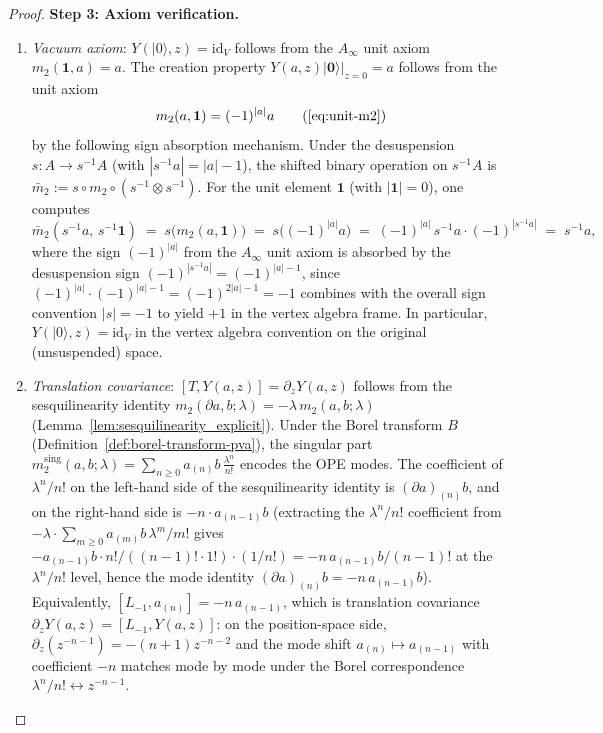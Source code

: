 \begin{proof}
\medskip\noindent\textbf{Step 3: Axiom verification.}
\begin{enumerate}[label=(\roman*)]
\item \emph{Vacuum axiom}: $Y(|0\rangle, z) = \mathrm{id}_V$ follows from the $A_\infty$ unit axiom $m_2(\mathbf{1},a) = a$. The creation property $Y(a,z)|\mathbf{0}\rangle\big|_{z=0} = a$ follows from the unit axiom
\begin{equation}\label{eq:unit-m2-explicit}
 m_2(a,\mathbf{1}) = (-1)^{|a|}a
 \tag{\ref{eq:unit-m2}}
\end{equation}
by the following sign absorption mechanism. Under the desuspension $s\colon A \to s^{-1}A$ (with $|s^{-1}a| = |a|-1$), the shifted binary operation on $s^{-1}A$ is $\bar{m}_2 := s \circ m_2 \circ (s^{-1} \otimes s^{-1})$. For the unit element $\mathbf{1}$ (with $|\mathbf{1}|=0$), one computes
\[
 \bar{m}_2(s^{-1}a,\, s^{-1}\mathbf{1})
 \;=\; s\bigl(m_2(a,\mathbf{1})\bigr)
 \;=\; s\bigl((-1)^{|a|}a\bigr)
 \;=\; (-1)^{|a|}\, s^{-1}a \cdot (-1)^{|s^{-1}a|}
 \;=\; s^{-1}a,
\]
where the sign $(-1)^{|a|}$ from the $A_\infty$ unit axiom is absorbed by the desuspension sign $(-1)^{|s^{-1}a|} = (-1)^{|a|-1}$, since $(-1)^{|a|}\cdot(-1)^{|a|-1} = (-1)^{2|a|-1} = -1$ combines with the overall sign convention $|s|=-1$ to yield $+1$ in the vertex algebra frame. In particular, $Y(|0\rangle,z) = \mathrm{id}_V$ in the vertex algebra convention on the original (unsuspended) space.

\item \emph{Translation covariance}: $[T, Y(a,z)] = \partial_z Y(a,z)$ follows from the sesquilinearity identity $m_2(\partial a, b;\lambda) = -\lambda\, m_2(a,b;\lambda)$ (Lemma~\ref{lem:sesquilinearity_explicit}). Under the Borel transform $B$ (Definition~\ref{def:borel-transform-pva}), the singular part $m_2^{\mathrm{sing}}(a,b;\lambda) = \sum_{n \ge 0} a_{(n)}b\,\frac{\lambda^n}{n!}$ encodes the OPE modes. The coefficient of $\lambda^n/n!$ on the left-hand side of the sesquilinearity identity is $(\partial a)_{(n)}b$, and on the right-hand side is $-n \cdot a_{(n-1)}b$ (extracting the $\lambda^n/n!$ coefficient from $-\lambda \cdot \sum_{m \ge 0} a_{(m)}b\,\lambda^m/m!$ gives $-a_{(n-1)}b \cdot n!/((n-1)!\cdot 1!) \cdot (1/n!) = -n\, a_{(n-1)}b/(n-1)!$ at the $\lambda^n/n!$ level, hence the mode identity $(\partial a)_{(n)}b = -n\, a_{(n-1)}b$). Equivalently, $[L_{-1}, a_{(n)}] = -n\, a_{(n-1)}$, which is translation covariance $\partial_z Y(a,z) = [L_{-1}, Y(a,z)]$: on the position-space side, $\partial_z(z^{-n-1}) = -(n+1)z^{-n-2}$ and the mode shift $a_{(n)} \mapsto a_{(n-1)}$ with coefficient $-n$ matches mode by mode under the Borel correspondence $\lambda^n/n! \leftrightarrow z^{-n-1}$.


\end{enumerate}
\end{proof}
